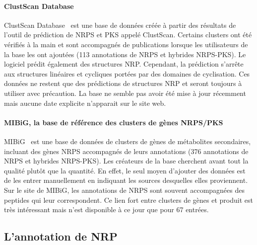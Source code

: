 \documentclass[12pt,french,twoside]{report}
\begin{document}
\paragraph{ClustScan Database}
ClustScan Database~\cite{diminic_databases_2013} est une base de données créée à partir des résultats de l'outil de prédiction de NRPS et PKS appelé ClustScan.
Certains clusters ont été vérifiés à la main et sont accompagnés de publications lorsque les utilisateurs de la base les ont ajoutées (113 annotations de NRPS et hybrides NRPS-PKS).
Le logiciel prédit également des structures NRP.
Cependant, la prédiction s'arrête aux structures linéaires et cycliques portées par des domaines de cyclisation.
Ces données ne restent que des prédictions de structures NRP et seront toujours à utiliser avec précaution.
La base ne semble pas avoir été mise à jour récemment mais aucune date explicite n'apparait sur le site web.


\paragraph{MIBiG, la base de référence des clusters de gènes NRPS/PKS}
MIBiG~\cite{medema_minimum_2015} est une base de données de clusters de gènes de métabolites secondaires, incluant des gènes NRPS accompagnés de leurs annotations (376 annotations de NRPS et hybrides NRPS-PKS).
Les créateurs de la base cherchent avant tout la qualité plutôt que la quantité.
En effet, le seul moyen d'ajouter des données est de les entrer manuellement en indiquant les sources desquelles elles proviennent.
Sur le site de MIBiG, les annotations de NRPS sont souvent accompagnées des peptides qui leur correspondent.
Ce lien fort entre clusters de gènes et produit est très intéressant mais n'est disponible à ce jour que pour 67 entrées.



\subsection{L'annotation de NRP}
\end{document}
